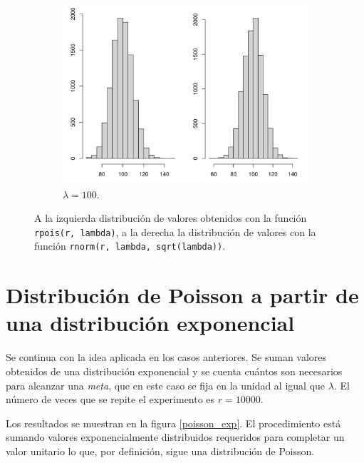 \documentclass[12pt]{article}
\begin{document}
\begin{figure}
\begin{subfigure}{\textwidth}
			\includegraphics[scale=0.5]{poisson_normal_vl100.png}
			\caption{$\lambda = 100$.}
			\label{poisson_norm100}
		\end{subfigure}
		\caption{A la izquierda distribución de valores obtenidos con la función \texttt{rpois(r, lambda)}, a la derecha la distribución de valores con la función \texttt{rnorm(r, lambda, sqrt(lambda))}.}
		\label{poisson_norm_r}
	\end{figure}
	
	\section{Distribución de Poisson a partir de una distribución exponencial}
	
	Se continua con la idea aplicada en los casos anteriores. Se suman valores obtenidos de una distribución exponencial y se cuenta cuántos son necesarios para alcanzar una {\em meta}, que en este caso se fija en la unidad al igual que $\lambda$. El número de veces que se repite el experimento es $r=10000$.
	
	Los resultados se muestran en la figura \ref{poisson_exp}. El procedimiento está sumando valores exponencialmente distribuidos requeridos para completar un valor unitario lo que, por definición, sigue una distribución de Poisson. 
	
\end{document}
